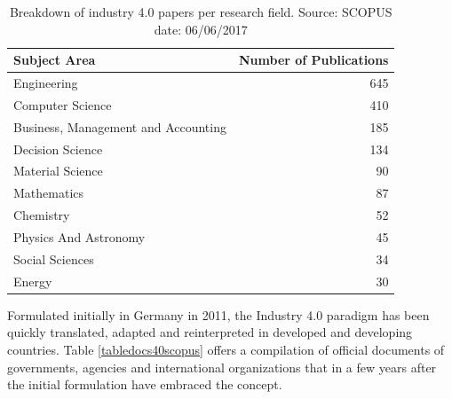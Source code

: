 \documentclass[]{book}
\theoremstyle{definition}
\theoremstyle{definition}
\theoremstyle{definition}
\theoremstyle{remark}
\begin{document}
\begin{table}

\caption{\label{tab:tabletech40scopus}Breakdown of industry 4.0 papers per research field. Source: SCOPUS date: 06/06/2017}
\centering
\begin{tabular}[t]{lr}
\toprule
Subject Area & Number of Publications\\
\midrule
Engineering & 645\\
Computer Science & 410\\
Business, Management and Accounting & 185\\
Decision Science & 134\\
Material Science & 90\\
\addlinespace
Mathematics & 87\\
Chemistry & 52\\
Physics And Astronomy & 45\\
Social Sciences & 34\\
Energy & 30\\
\bottomrule
\end{tabular}
\end{table}

Formulated initially in Germany in 2011, the Industry 4.0 paradigm has
been quickly translated, adapted and reinterpreted in developed and
developing countries. Table \ref{tabledocs40scopus} offers a compilation
of official documents of governments, agencies and international
organizations that in a few years after the initial formulation have
embraced the concept.
\end{document}

